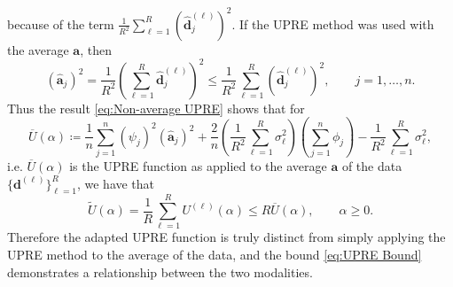 \documentclass[12pt]{article}
\newcommand{\aVec}{\mathbf{a}}	%
\newcommand{\dVec}{\mathbf{d}}	%
\newcommand{\dft}[1]{\widehat{#1}}	%
\newcommand{\regparam}{\alpha}
\newcommand{\filt}{\phi}
\newcommand{\mfilt}{\psi}
\newcommand{\noiseSD}{\sigma}	%
\newcommand{\U}{U}	%
\begin{document}
because of the term $\frac{1}{R^2} \sum_{\ell=1}^R \left(\dft{\dVec}_j^{(\ell)}\right)^2$. If the UPRE method was used with the average $\aVec$, then
\begin{equation}
\label{eq:Coefficients of Average}
\left(\dft{\aVec}_j\right)^2 = \frac{1}{R^2}\left(\sum_{\ell=1}^R \dft{\dVec}_j^{(\ell)}\right)^2 \leq \frac{1}{R^2} \sum_{\ell=1}^R \left(\dft{\dVec}_j^{(\ell)}\right)^2, \qquad j = 1,\ldots,n.
\end{equation}
Thus the result \eqref{eq:Non-average UPRE} shows that for
\begin{equation}
\label{eq:UPRE of Average}
\overline{U}(\regparam) \coloneqq \frac{1}{n}\sum_{j=1}^{n} \left(\mfilt_j\right)^2\left(\dft{\aVec}_j\right)^2 + \frac{2}{n} \left(\frac{1}{R^2} \sum_{\ell=1}^R \noiseSD_\ell^2\right) \left(\sum_{j=1}^{n} \filt_j\right) - \frac{1}{R^2} \sum_{\ell=1}^R\noiseSD_\ell^2,
\end{equation}
i.e. $\overline{U}(\regparam)$ is the UPRE function as applied to the average $\aVec$ of the data $\{\dVec^{(\ell)}\}_{\ell=1}^R$, we have that
\begin{equation}
\label{eq:UPRE Bound}
\widetilde{U}(\regparam) = \frac{1}{R} \sum_{\ell=1}^R \U^{(\ell)}(\regparam) \leq R \overline{U}(\regparam), \qquad \regparam \geq 0.
\end{equation}
Therefore the adapted UPRE function is truly distinct from simply applying the UPRE method to the average of the data, and the bound \eqref{eq:UPRE Bound} demonstrates a relationship between the two modalities.
\end{document}
